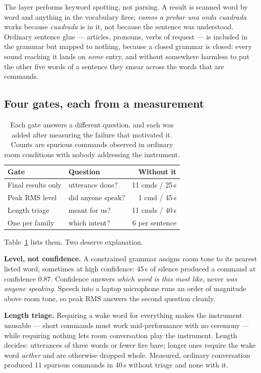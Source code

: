 \documentclass[a4paper,11pt]{article}
\begin{document}
The layer performs keyword spotting, not parsing. A result is scanned word by
word and anything in the vocabulary fires; \emph{vamos a probar una onda
cuadrada} works because \emph{cuadrada} is in it, not because the sentence was
understood. Ordinary sentence glue --- articles, pronouns, verbs of request ---
is included in the grammar but mapped to nothing, because a closed grammar is
closed: every sound reaching it lands on \emph{some} entry, and without
somewhere harmless to put the other five words of a sentence they smear across
the words that are commands.

\subsection{Four gates, each from a measurement}

\begin{table}[htbp]
\centering\small
\begin{tabular}{@{}llr@{}}
\toprule
Gate & Question & Without it \\
\midrule
Final results only & utterance done?   & 11 cmds / 25\,s \\
Peak RMS level     & did anyone speak? & 1 cmd / 45\,s \\
Length triage      & meant for us?     & 11 cmds / 40\,s \\
One per family     & which intent?     & 6 per sentence \\
\bottomrule
\end{tabular}
\caption{Each gate answers a different question, and each was added after
measuring the failure that motivated it. Counts are spurious commands observed
in ordinary room conditions with nobody addressing the instrument.}
\label{tab:gates}
\end{table}

Table~\ref{tab:gates} lists them. Two deserve explanation.

\textbf{Level, not confidence.} A constrained grammar assigns room tone to its
nearest listed word, sometimes at high confidence: 45\,s of silence produced a
command at confidence $0.87$. Confidence answers \emph{which word is this most
like}, never \emph{was anyone speaking}. Speech into a laptop microphone runs
an order of magnitude above room tone, so peak RMS answers the second question
cleanly.

\textbf{Length triage.} Requiring a wake word for everything makes the
instrument unusable --- short commands must work mid-performance with no
ceremony --- while requiring nothing lets room conversation play the
instrument. Length decides: utterances of three words or fewer fire bare;
longer ones require the wake word \emph{aether} and are otherwise dropped
whole. Measured, ordinary conversation produced 11 spurious commands in 40\,s
without triage and none with it.
\end{document}
